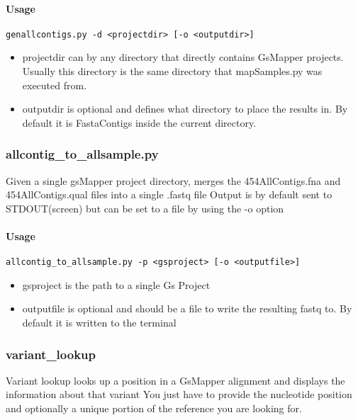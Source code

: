 \documentclass{article}
\begin{document}
\paragraph{Usage}

\begin{lstlisting}
genallcontigs.py -d <projectdir> [-o <outputdir>]
\end{lstlisting}
\begin{itemize}
 \item projectdir can by any directory that directly contains GsMapper projects. Usually this directory is the same directory that mapSamples.py was executed from.
 \item outputdir is optional and defines what directory to place the results in. By default it is FastaContigs inside the current directory.
\end{itemize}

\subsubsection{allcontig\_to\_allsample.py}
Given a single gsMapper project directory, merges the 454AllContigs.fna and 454AllContigs.qual 
files into a single .fastq file Output is by default sent to STDOUT(screen) but can be set to a file by using the -o option

\paragraph{Usage}

\begin{lstlisting}
allcontig_to_allsample.py -p <gsproject> [-o <outputfile>]
\end{lstlisting}

\begin{itemize}
 \item gsproject is the path to a single Gs Project
 \item outputfile is optional and should be a file to write the resulting fastq to. By default it is written to the terminal
\end{itemize}

\subsubsection{variant\_lookup}
Variant lookup looks up a position in a GsMapper alignment and displays the information about that variant
You just have to provide the nucleotide position and optionally a unique portion of the reference you are looking for.
\end{document}
